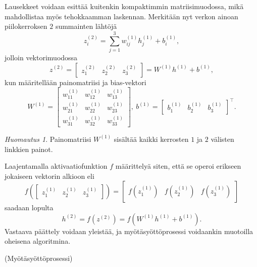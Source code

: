 \documentclass[12pt,a4paper,finnish,oneside,titlepage]{article}
\makeatletter
\newcommand{\multiline}[1]{%
    \begin{tabularx}{\dimexpr\linewidth-\ALG@thistlm}[t]{@{}X@{}}
        #1
    \end{tabularx}
}
\newcommand{\Input}[1]{\algrenewcommand{\alglinenumber}[1]{\textbf{Syöte:} \ \setcounter{ALG@line}{\numexpr##1-1}} #1}
\newcommand{\Step}[1]{\algrenewcommand{\alglinenumber}[1]{Askel ##1: } #1}
\newcommand{\NoNumber}{\algrenewcommand{\alglinenumber}[1]{\setcounter{ALG@line}{\numexpr##1-1} \ \ \ \ \ \ \ \ \ \ }}
\newcommand{\Output}[1]{\algrenewcommand{\alglinenumber}[1]{\textbf{Ulostulo:}\setcounter{ALG@line}{\numexpr##1-1}} #1}
\theoremstyle{plain}
\theoremstyle{definition}
\theoremstyle{remark}
\newtheorem{huom}[lause]{Huomautus}    %
\makeatother
\begin{document}
Lausekkeet voidaan esittää kuitenkin kompaktimmin matriisimuodossa, mikä mahdollistaa myös tehokkaamman laskennan. Merkitään nyt verkon ainoan piilokerroksen \(2\) summainten lähtöjä \[
    z_i^{(2)}=\sum_{j=1}^{3} w_{ij}^{(1)} h_j^{(1)}+b_i^{(1)},
\]
jolloin vektorimuodossa
\[
    z^{(2)}=\begin{bmatrix} z_1^{(2)} & z_2^{(2)} & z_3^{(2)} \end{bmatrix}=W^{(1)} h^{(1)}+b^{(1)},
\]
kun määritellään painomatriisi ja bias-vektori
\begin{equation}
    W^{(1)}=\begin{bmatrix}
        w_{11}^{(1)} & w_{12}^{(1)} & w_{13}^{(1)}\\
        w_{21}^{(1)} & w_{22}^{(1)} & w_{23}^{(1)}\\
        w_{31}^{(1)} & w_{32}^{(1)} & w_{33}^{(1)}
    \end{bmatrix}, \ b^{(1)}=\begin{bmatrix} b_1^{(1)} & b_2^{(1)} & b_3^{(1)} \end{bmatrix}^{\top}.
\end{equation}
\begin{huom}
Painomatriisi \(W^{(1)}\) sisältää kaikki kerrosten \(1\) ja \(2\) välisten linkkien painot.
\end{huom}
Laajentamalla aktivaatiofunktion \(f\) määrittelyä siten, että se operoi erikseen jokaiseen vektorin alkioon eli \[f\left(\begin{bmatrix} z_1^{(1)} & z_2^{(1)} & z_3^{(1)}\end{bmatrix}\right)=\begin{bmatrix} f\left(z_1^{(1)}\right) & f\left(z_2^{(1)}\right) & f\left(z_3^{(1)}\right) \end{bmatrix}\] saadaan lopulta
\[h^{(2)}=f(z^{(2)})=f(W^{(1)}h^{(1)}+b^{(1)}).\]
Vastaava päättely voidaan yleistää, ja myötäsyöttöprosessi voidaankin muotoilla oheisena algoritmina.

\begin{algorithm}[H]
\renewcommand{\thealgorithm}{1}
    \caption{(Myötäsyöttöprosessi)}
\end{algorithm}
\end{document}
